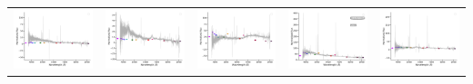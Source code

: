\begin{center}
\begin{longtable}{l l l l l }
    \includegraphics[width=0.19\linewidth, clip]{Figs/Figs-lamost/spec-56944-EG025338N015809M01_sp01-052-STRIPE82-0062-010774.pdf} & \includegraphics[width=0.19\linewidth, clip]{Figs/Figs-lamost/spec-56944-EG025338N015809M01_sp08-159-STRIPE82-0064-069216.pdf} & \includegraphics[width=0.19\linewidth, clip]{Figs/Figs-lamost/spec-56944-EG025338N015809M01_sp08-213-STRIPE82-0064-031755.pdf} & \includegraphics[width=0.19\linewidth, clip]{Figs/Figs-lamost/spec-56945-EG233528N011847B01_sp02-123-SPLUS-s02s22-033516.pdf} & \includegraphics[width=0.19\linewidth, clip]{Figs/Figs-lamost/spec-56945-EG233528N011847B01_sp05-120-STRIPE82-0164-033376.pdf} \\

\end{longtable}
\end{center}
